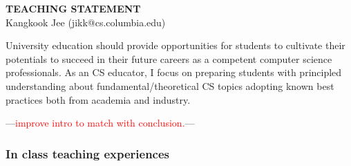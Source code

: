 \documentclass[letterpaper, 10pt]{article}
\newcommand{\jikk}[1]{{---\textcolor{red}{#1}---}}
\newcommand{\jikk}[1]{}
\begin{document}
\thispagestyle{fancy}

\lhead{}
\rhead{}

\renewcommand{\headrulewidth}{0pt} 
\renewcommand{\footrulewidth}{0pt} 

\fancyfoot[C]{\footnotesize
        \textcolor{gray}{http://www.cs.columbia.edu/$\sim$jikk/application}} 

\pagestyle{fancy}
\lhead{\textcolor{gray}{\it Kangkook Jee}}
\rhead{\textcolor{gray}{\thepage /\pageref{LastPage}}}

\begin{small}

\begin{center} {\LARGE \bf TEACHING STATEMENT}\\ \vspace*{0.1cm} {\normalsize
Kangkook Jee (jikk@cs.columbia.edu)} \end{center}
University education should provide opportunities for students to cultivate their
potentials to succeed in their future careers as a competent computer science
professionals.  
%
As an CS educator, I focus on preparing students with principled understanding
about fundamental/theoretical CS topics adopting known best practices both
from academia and industry.

\jikk{improve intro to match with conclusion.}



\subsubsection*{In class teaching experiences}


\end{small}
\end{document}
